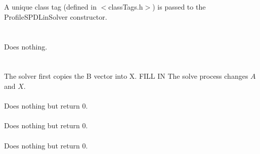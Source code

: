   \\
  \\
A unique class tag (defined in $<$classTags.h$>$) is passed to the
ProfileSPDLinSolver constructor. \\


 \\
\\ 
Does nothing. \\

  \\
 \\
The solver first copies the B vector into X.
FILL IN
The solve process changes $A$ and $X$. \\   

 \\
Does nothing but return $0$. \\

 \\ 
Does nothing but return $0$. \\

 \\ 
Does nothing but return $0$. \\







